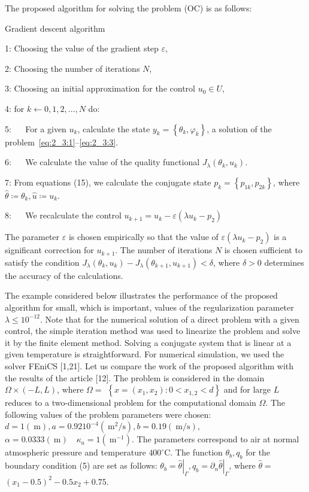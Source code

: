 The proposed algorithm for solving the problem (OC) is as follows:

Gradient descent algorithm

1: Choosing the value of the gradient step $\varepsilon$,

2: Choosing the number of iterations $N$,

3: Choosing an initial approximation for the control $u_{0} \in U$,

4: for $k \leftarrow 0,1,2, \ldots, N$ do:

5: $\quad$ For a given $u_{k}$, calculate the state
$y_{k}=\left\{\theta_{k}, \varphi_{k}\right\}$, a solution of
the problem~\eqref{eq:2_3:1}--\eqref{eq:2_3:3}.

6: $\quad$ We calculate the value of the quality
functional $J_{\lambda}\left(\theta_{k}, u_{k}\right)$.

7: From equations (15), we calculate the conjugate
state $p_{k}=\left\{p_{1 k}, p_{2 k}\right\}$,
where $\widehat{\theta} \coloneqq \theta_{k}, \widehat{u} \coloneqq u_{k}$.

8: $\quad$ We recalculate the control
$u_{k+1}=u_{k}-\varepsilon\left(\lambda u_{k}-p_{2}\right)$

The parameter $\varepsilon$ is chosen empirically so that the
value of $\varepsilon\left(\lambda u_{k}-p_{2}\right)$ is a
significant correction for $u_{k+1}$.
The number of iterations $N$ is chosen sufficient to
satisfy the condition $J_{\lambda}\left(\theta_{k}, u_{k}\right)
-J_{\lambda}\left(\theta_{k+1}, u_{k+1}\right)<\delta$, where $\delta>0$
determines the accuracy of the calculations.

The example considered below illustrates the performance of the proposed
algorithm for small, which is important, values of the regularization
parameter $\lambda \leq 10^{-12}$.
Note that for the numerical solution of a direct problem with a given control,
the simple iteration method was used to linearize the problem and solve
it by the finite element method.
Solving a conjugate system that is linear
at a given temperature is straightforward.
For numerical simulation, we used the solver FEniCS [1,21].
Let us compare the work of the proposed
algorithm with the results of the article [12].
The problem is considered in the domain $\Omega \times(-L, L)$,
where $\Omega=$ $\left\{x=\left(x_{1}, x_{2}\right): 0<x_{1,2}<d\right\}$
and for large $L$ reduces to a two-dimensional problem for the computational
domain $\Omega$.
The following values of the problem parameters were chosen:
$d=1(\mathrm{~m}), a=0.9210^{-4}\left(\mathrm{~m}^{2} / \mathrm{s}\right),
b=0.19(\mathrm{~m} / \mathrm{s})$, $\alpha=0.0333(\mathrm{~m})
\quad \kappa_{a}=1\left(\mathrm{~m}^{-1}\right)$.
The parameters correspond to air at normal atmospheric pressure
and temperature $400^{\circ} \mathrm{C}$.
The function $\theta_{b}, q_{b}$ for the boundary condition (5)
are set as follows: $\theta_{b}=\left.\widehat{\theta}\right|_{\Gamma},
q_{b}=\left.\partial_{n} \widehat{\theta}\right|_{\Gamma}$,
where $\widehat{\theta}=$ $\left(x_{1}-0.5\right)^{2}-0.5 x_{2}+0.75$.

